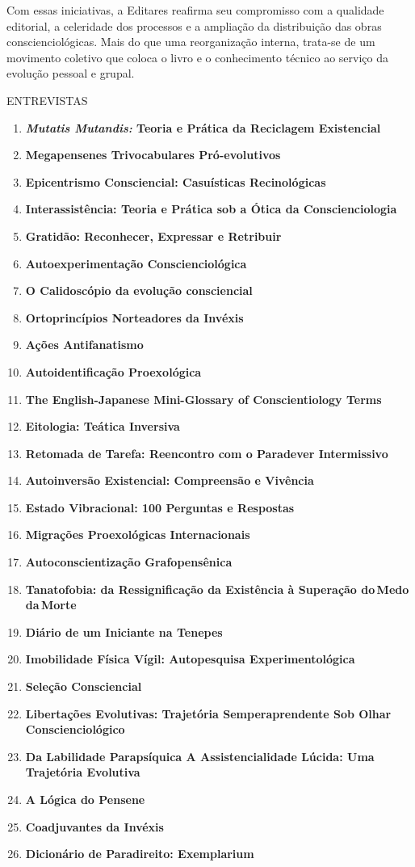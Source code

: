 Com essas iniciativas, a Editares reafirma seu compromisso com a qualidade editorial, a celeridade dos processos e a ampliação da distribuição das obras conscienciológicas. Mais do que uma reorganização interna, trata-se de um movimento coletivo que coloca o livro e o conhecimento técnico ao serviço da evolução pessoal e grupal.

ENTREVISTAS

\begin{enumerate}
\def\labelenumi{\arabic{enumi}.}
\item
  \textbf{\emph{Mutatis Mutandis:} Teoria e Prática da Reciclagem Existencial}
\item
  \textbf{Megapensenes Trivocabulares Pró-evolutivos}
\item
  \textbf{Epicentrismo Consciencial: Casuísticas Recinológicas}
\item
  \textbf{Interassistência: Teoria e Prática sob a Ótica da Conscienciologia}
\item
  \textbf{Gratidão: Reconhecer, Expressar e Retribuir}
\item
  \textbf{Autoexperimentação Conscienciológica}
\item
  \textbf{O Calidoscópio da evolução consciencial}
\item
  \textbf{Ortoprincípios Norteadores da Invéxis}
\item
  \textbf{Ações Antifanatismo}
\item
  \textbf{Autoidentificação Proexológica}
\item
  \textbf{The English-Japanese Mini-Glossary of Conscientiology Terms}
\item
  \textbf{Eitologia: Teática Inversiva}
\item
  \textbf{Retomada de Tarefa: Reencontro com o Paradever Intermissivo}
\item
  \textbf{Autoinversão Existencial: Compreensão e Vivência}
\item
  \textbf{Estado Vibracional: 100 Perguntas e Respostas}
\item
  \textbf{Migrações Proexológicas Internacionais}
\item
  \textbf{Autoconscientização Grafopensênica}
\item
  \textbf{Tanatofobia: da Ressignificação da Existência à Superação do\,Medo\,da\,Morte}
\item
  \textbf{Diário de um Iniciante na Tenepes}
\item
  \textbf{Imobilidade Física Vígil: Autopesquisa Experimentológica}
\item
  \textbf{Seleção Consciencial}
\item
  \textbf{Libertações Evolutivas: Trajetória Semperaprendente Sob Olhar Conscienciológico}
\item
  \textbf{Da Labilidade Parapsíquica A Assistencialidade Lúcida: Uma Trajetória Evolutiva}
\item
  \textbf{A Lógica do Pensene}
\item
  \textbf{Coadjuvantes da Invéxis}
\item
  \textbf{Dicionário de Paradireito: Exemplarium}
\end{enumerate}


